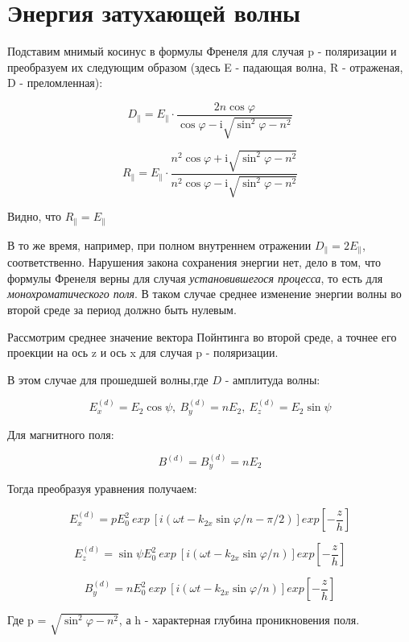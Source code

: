	\section{Энергия затухающей волны}
	
	Подставим мнимый косинус в формулы Френеля для случая p - поляризации и преобразуем их следующим образом (здесь E - падающая волна, R - отраженая, D - преломленная):
	
	\[  D_{\parallel} = E_{\parallel} \cdot \frac {2 n \cos{\varphi}} { \cos{ \varphi  - \text{i} \sqrt{\sin^{2}{\varphi}  - n^2}  }} \]
	
	\[  R_{\parallel} = E_{\parallel} \cdot \frac { n^{2} \cos{ \varphi  + \text{i} \sqrt{\sin^{2}{\varphi}  - n^2}  } } { n^{2} \cos{ \varphi  - \text{i} \sqrt{\sin^{2}{\varphi}  - n^2}  } } \]
	
	Видно, что $R_{\parallel} = E_{\parallel} $
	
	В то же время, например, при полном внутреннем отражении $ D_{\parallel}  = 2 E_{\parallel} $, соответственно. Нарушения закона сохранения энергии нет, дело в том, что формулы Френеля верны для случая \textit{установившегося процесса}, то есть для \textit{монохроматического поля}. В таком случае среднее изменение энергии волны во второй среде за период должно быть нулевым.
	
	Рассмотрим среднее значение вектора Пойнтинга во второй среде, а точнее его проекции на ось z  и ось x для случая p - поляризации.
	
	В этом случае для прошедшей волны,где $ D $ - амплитуда волны:
	
	\[E_{x}^{(d)} = E_{2} \cos{ \psi}, \ B_{y}^{(d)} = n E_{2}, \ E_{z}^{(d)} = E_{2} \sin{\psi} \]
	
	Для магнитного поля: 
	
	\[ B^{(d)} = B_{y}^{(d)}  = n E_{2} \]
	
	Тогда преобразуя уравнения получаем:
	
	\[E_{x}^{(d)} = p E_{0}^{2} \ exp \ [i (\omega t - k_{2x} \sin{\varphi} / n - \pi / 2)  ]  exp[- \frac{z}{h} ] \]
	
		\[E_{z}^{(d)} = \sin{\psi} E_{0}^{2} \ exp \ [i (\omega t - k_{2x} \sin{\varphi} / n)  ]  exp[- \frac{z}{h} ] \]
		
			\[B_{y}^{(d)} = n E_{0}^{2} \ exp \ [i (\omega t - k_{2x} \sin{\varphi} / n)  ]  exp[- \frac{z}{h} ] \]
			
	Где p = $ \sqrt{\sin^{2}{\varphi}  - n^2} $, а h - характерная глубина проникновения поля.
			
